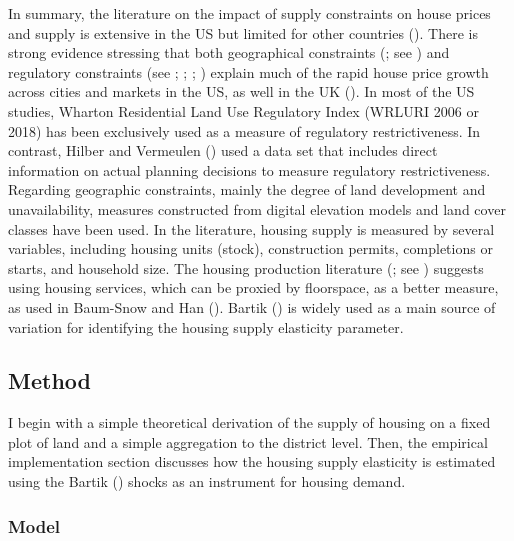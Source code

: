 \documentclass[
  12pt,
]{article}
\begin{document}
In summary, the literature on the impact of supply constraints on house prices and supply is extensive in the US but limited for other countries (). There is strong evidence stressing that both geographical constraints (; see ) and regulatory constraints (see ; ; ; ) explain much of the rapid house price growth across cities and markets in the US, as well in the UK (). In most of the US studies, Wharton Residential Land Use Regulatory Index (WRLURI 2006 or 2018) has been exclusively used as a measure of regulatory restrictiveness. In contrast, Hilber and Vermeulen () used a data set that includes direct information on actual planning decisions to measure regulatory restrictiveness. Regarding geographic constraints, mainly the degree of land development and unavailability, measures constructed from digital elevation models and land cover classes have been used. In the literature, housing supply is measured by several variables, including housing units (stock), construction permits, completions or starts, and household size. The housing production literature (; see ) suggests using housing services, which can be proxied by floorspace, as a better measure, as used in Baum-Snow and Han (). Bartik () is widely used as a main source of variation for identifying the housing supply elasticity parameter.

\subsection{Method}\label{method}

I begin with a simple theoretical derivation of the supply of housing on a fixed plot of land and a simple aggregation to the district level. Then, the empirical implementation section discusses how the housing supply elasticity is estimated using the Bartik () shocks as an instrument for housing demand.

\subsubsection{Model}\label{model}
\end{document}
